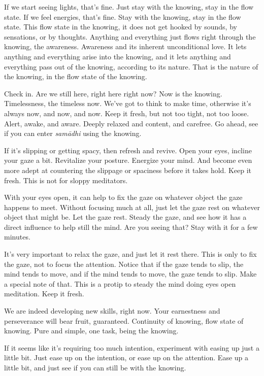 \documentclass[12pt,openany]{book}
\begin{document}
If we start seeing lights, that's fine. Just stay with the knowing, stay in the flow state. If we feel energies, that's fine. Stay with the knowing, stay in the flow state. This flow state in the knowing, it does not get hooked by sounds, by sensations, or by thoughts. Anything and everything just flows right through the knowing, the awareness. Awareness and its inherent unconditional love. It lets anything and everything arise into the knowing, and it lets anything and everything pass out of the knowing, according to its nature. That is the nature of the knowing, in the flow state of the knowing.

Check in. Are we still here, right here right now? Now is the knowing. Timelessness, the timeless now. We've got to think to make time, otherwise it’s always now, and now, and now. Keep it fresh, but not too tight, not too loose. Alert, awake, and aware. Deeply relaxed and content, and carefree. Go ahead, see if you can enter \textit{samādhi} using the knowing.

If it's slipping or getting spacy, then refresh and revive. Open your eyes, incline your gaze a bit. Revitalize your posture. Energize your mind. And become even more adept at countering the slippage or spaciness before it takes hold. Keep it fresh. This is not for sloppy meditators.

With your eyes open, it can help to fix the gaze on whatever object the gaze happens to meet. Without focusing much at all, just let the gaze rest on whatever object that might be. Let the gaze rest. Steady the gaze, and see how it has a direct influence to help still the mind. Are you seeing that? Stay with it for a few minutes.

It’s very important to relax the gaze, and just let it rest there. This is only to fix the gaze, not to focus the attention. Notice that if the gaze tends to slip, the mind tends to move, and if the mind tends to move, the gaze tends to slip. Make a special note of that. This is a protip to steady the mind doing eyes open meditation. Keep it fresh. 

We are indeed developing new skills, right now. Your earnestness and perseverance will bear fruit, guaranteed. Continuity of knowing, flow state of knowing. Pure and simple, one task, being the knowing.

If it seems like it's requiring too much intention, experiment with easing up just a little bit. Just ease up on the intention, or ease up on the attention. Ease up a little bit, and just see if you can still be with the knowing.
\end{document}
